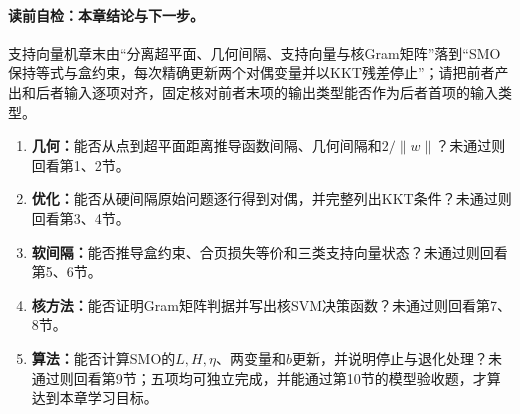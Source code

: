 \paragraph{读前自检：本章结论与下一步。}支持向量机章末由“分离超平面、几何间隔、支持向量与核Gram矩阵”落到“SMO保持等式与盒约束，每次精确更新两个对偶变量并以KKT残差停止”；请把前者产出和后者输入逐项对齐，固定核对前者末项的输出类型能否作为后者首项的输入类型。\par

\begin{SLCompactClosure}
\label{struct:V3-C02-CH36}

\label{struct:V3-C02-CH37}
\begin{selfcheckbox}
\begin{enumerate}[leftmargin=2.2em]
  \item \textbf{几何：}能否从点到超平面距离推导函数间隔、几何间隔和$2/\lVert w\rVert$？未通过则回看第1、2节。
  \item \textbf{优化：}能否从硬间隔原始问题逐行得到对偶，并完整列出KKT条件？未通过则回看第3、4节。
  \item \textbf{软间隔：}能否推导盒约束、合页损失等价和三类支持向量状态？未通过则回看第5、6节。
  \item \textbf{核方法：}能否证明Gram矩阵判据并写出核SVM决策函数？未通过则回看第7、8节。
  \item \textbf{算法：}能否计算SMO的$L,H,\eta$、两变量和$b$更新，并说明停止与退化处理？未通过则回看第9节；五项均可独立完成，并能通过第10节的模型验收题，才算达到本章学习目标。
\end{enumerate}
\end{selfcheckbox}
\end{SLCompactClosure}
